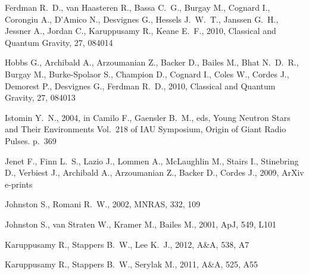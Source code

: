 \documentclass[fleqn,usenatbib]{mnras}
\begin{document}
\begin{thebibliography}{99}
{Ferdman} R.~D., {van Haasteren} R., {Bassa} C.~G., {Burgay} M., {Cognard}
  I., {Corongiu} A., {D'Amico} N., {Desvignes} G., {Hessels} J.~W.~T., 
  {Janssen} G.~H., {Jessner} A., {Jordan} C., {Karuppusamy} R., {Keane} 
  E.~F., 2010, Classical and Quantum Gravity, 27, 084014

{Hobbs} G., {Archibald} A., {Arzoumanian} Z., {Backer} D., {Bailes} M., 
  {Bhat} N.~D.~R., {Burgay} M., {Burke-Spolaor} S., {Champion} D., 
  {Cognard} I., {Coles} W., {Cordes} J., {Demorest} P., {Desvignes} G., 
  {Ferdman} R.~D., 2010, Classical and Quantum Gravity, 27, 084013

{Istomin} Y.~N., 2004, in {Camilo} F., {Gaensler} B.~M., eds, Young Neutron
  Stars and Their Environments Vol.~218 of IAU Symposium, {Origin of Giant
  Radio Pulses}. p.~369

{Jenet} F., {Finn} L.~S., {Lazio} J., {Lommen} A., {McLaughlin} M., 
  {Stairs} I., {Stinebring} D., {Verbiest} J., {Archibald} A., 
  {Arzoumanian} Z., {Backer} D., {Cordes} J., 2009, ArXiv e-prints

{Johnston} S., {Romani} R.~W., 2002, MNRAS, 332, 109

{Johnston} S., {van Straten} W., {Kramer} M., {Bailes} M., 2001, ApJ, 549, L101

{Karuppusamy} R., {Stappers} B.~W., {Lee} K.~J., 2012, A\&A, 538, A7

{Karuppusamy} R., {Stappers} B.~W., {Serylak} M., 2011, A\&A, 525, A55


\end{thebibliography}
\end{document}

